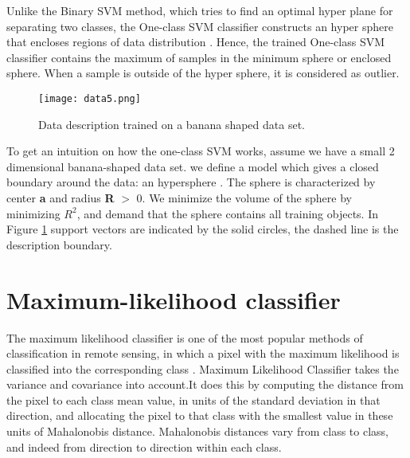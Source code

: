  Unlike the Binary SVM method, which tries to find an optimal hyper plane for separating two classes, the One-class SVM classifier constructs an hyper sphere that encloses regions of data distribution \cite{guerbai2014effective}. Hence, the trained One-class SVM classifier contains the maximum of samples in the minimum sphere or enclosed sphere. When a sample is outside of the hyper sphere, it is considered as outlier.

\begin{figure}[]
\centering
\texttt{[image: data5.png]}
\caption{Data description trained on a banana shaped data set.}
\label{fig1}
\end{figure}

To get an intuition on how the one-class SVM works, assume we have a small 2 dimensional banana-shaped data set. we define a model which gives a closed boundary around the data: an hypersphere \cite{tax2004support}. The sphere is characterized by center \textbf{a} and radius \textbf{R} $>$ 0. We minimize the volume of the sphere by minimizing \textbf{$R^2$}, and demand that the sphere contains all training objects. In Figure \ref{fig1} support vectors are indicated by the solid circles, the dashed line is the description boundary.



\section{Maximum-likelihood classifier}

The maximum likelihood classifier is one of the most popular methods of classification in remote sensing, in which a pixel with the maximum likelihood is classified into the corresponding class \cite{RSGS:2012}. Maximum Likelihood Classifier takes the variance and covariance into account.It does this by computing the distance from the pixel to each class mean value, in units of the standard deviation in that direction, and allocating the pixel to that class with the smallest value in these units of Mahalonobis distance. Mahalonobis distances vary from class to class, and indeed from direction to direction within each class.



